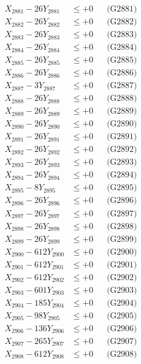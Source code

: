 \documentclass[a4paper,10pt]{article}
\begin{document}
{\begin{align}
\allowbreak
X_{2881} - 26Y_{2881} &\leq +0 && \text{(G2881)} \\
X_{2882} - 26Y_{2882} &\leq +0 && \text{(G2882)} \\
X_{2883} - 26Y_{2883} &\leq +0 && \text{(G2883)} \\
X_{2884} - 26Y_{2884} &\leq +0 && \text{(G2884)} \\
X_{2885} - 26Y_{2885} &\leq +0 && \text{(G2885)} \\
X_{2886} - 26Y_{2886} &\leq +0 && \text{(G2886)} \\
X_{2887} - 3Y_{2887} &\leq +0 && \text{(G2887)} \\
X_{2888} - 26Y_{2888} &\leq +0 && \text{(G2888)} \\
X_{2889} - 26Y_{2889} &\leq +0 && \text{(G2889)} \\
X_{2890} - 26Y_{2890} &\leq +0 && \text{(G2890)} \\
\allowbreak
X_{2891} - 26Y_{2891} &\leq +0 && \text{(G2891)} \\
X_{2892} - 26Y_{2892} &\leq +0 && \text{(G2892)} \\
X_{2893} - 26Y_{2893} &\leq +0 && \text{(G2893)} \\
X_{2894} - 26Y_{2894} &\leq +0 && \text{(G2894)} \\
X_{2895} - 8Y_{2895} &\leq +0 && \text{(G2895)} \\
X_{2896} - 26Y_{2896} &\leq +0 && \text{(G2896)} \\
X_{2897} - 26Y_{2897} &\leq +0 && \text{(G2897)} \\
X_{2898} - 26Y_{2898} &\leq +0 && \text{(G2898)} \\
X_{2899} - 26Y_{2899} &\leq +0 && \text{(G2899)} \\
X_{2900} - 612Y_{2900} &\leq +0 && \text{(G2900)} \\
\allowbreak
X_{2901} - 612Y_{2901} &\leq +0 && \text{(G2901)} \\
X_{2902} - 612Y_{2902} &\leq +0 && \text{(G2902)} \\
X_{2903} - 601Y_{2903} &\leq +0 && \text{(G2903)} \\
X_{2904} - 185Y_{2904} &\leq +0 && \text{(G2904)} \\
X_{2905} - 98Y_{2905} &\leq +0 && \text{(G2905)} \\
X_{2906} - 136Y_{2906} &\leq +0 && \text{(G2906)} \\
X_{2907} - 265Y_{2907} &\leq +0 && \text{(G2907)} \\
X_{2908} - 612Y_{2908} &\leq +0 && \text{(G2908)} \\

\end{align}}
\end{document}
